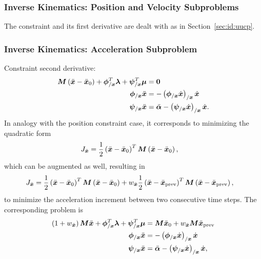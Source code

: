 \subsubsection{Inverse Kinematics: Position and Velocity Subproblems}
The constraint and its first derivative are dealt with
as in Section~\ref{sec:id:uucp}.

\subsubsection{Inverse Kinematics: Acceleration Subproblem}
Constraint second derivative:
\begin{subequations}
\begin{align}
	\bm{M} \left( \ddot{\bm{x}} - \ddot{\bm{x}}_0 \right)
	+
	\bm{\phi}_{/\bm{x}}^T \bm{\lambda}
	+
	\bm{\psi}_{/\bm{x}}^T \bm{\mu}
	&=
	\bm{0}
	\\
	\bm{\phi}_{/\bm{x}} \ddot{\bm{x}}
	&=
	-\left( \bm{\phi}_{/\bm{x}} \dot{\bm{x}} \right)_{/\bm{x}} \dot{\bm{x}}
	\\
	\bm{\psi}_{/\bm{x}} \ddot{\bm{x}}
	&=
	\ddot{\bm{\alpha}}
	-
	\left( \bm{\psi}_{/\bm{x}} \dot{\bm{x}} \right)_{/\bm{x}} \dot{\bm{x}}
	.
\end{align}
\end{subequations}
In analogy with the position constraint case,
it corresponds to minimizing the quadratic form
\begin{align}
	J_{\ddot{\bm{x}}}
	&=
	\frac{1}{2} \left( \ddot{\bm{x}} - \ddot{\bm{x}}_0 \right)^T \bm{M} \left( \ddot{\bm{x}} - \ddot{\bm{x}}_0 \right)
	,
\end{align}
which can be augmented as well, resulting in
\begin{align}
	J_{\ddot{\bm{x}}}
	&=
	\frac{1}{2} \left( \ddot{\bm{x}} - \ddot{\bm{x}}_0 \right)^T \bm{M} \left( \ddot{\bm{x}} - \ddot{\bm{x}}_0 \right)
	+
	w_{\ddot{\bm{x}}} \frac{1}{2} \left( \ddot{\bm{x}} - \ddot{\bm{x}}_\text{prev} \right)^T \bm{M} \left( \ddot{\bm{x}} - \ddot{\bm{x}}_\text{prev} \right)
	,
\end{align}
to minimize the acceleration increment between two consecutive time steps.
The corresponding problem is
\begin{subequations}
\begin{align}
	\left( 1 + w_{\dot{\bm{x}}} \right) \bm{M} \ddot{\bm{x}}
	+
	\bm{\phi}_{/\bm{x}}^T \bm{\lambda}
	+
	\bm{\psi}_{/\bm{x}}^T \bm{\mu}
	&=
	\bm{M} \ddot{\bm{x}}_0
	+
	w_{\ddot{\bm{x}}} \bm{M} \ddot{\bm{x}}_\text{prev}
	\\
	\bm{\phi}_{/\bm{x}} \ddot{\bm{x}}
	&=
	-\left( \bm{\phi}_{/\bm{x}} \dot{\bm{x}} \right)_{/\bm{x}} \dot{\bm{x}}
	\\
	\bm{\psi}_{/\bm{x}} \ddot{\bm{x}}
	&=
	\ddot{\bm{\alpha}}
	-
	\left( \bm{\psi}_{/\bm{x}} \dot{\bm{x}} \right)_{/\bm{x}} \dot{\bm{x}}
	,
\end{align}
\end{subequations}

